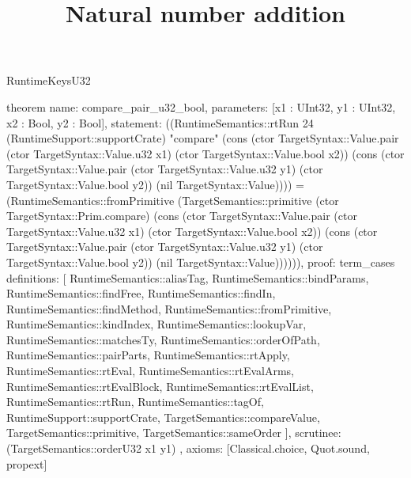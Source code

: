 \begin{lexlean}{RuntimeKeysU32}
\title{Natural number addition}
\begin{semanticmodule}
theorem{
  name: compare_pair_u32_bool,
  parameters: [x1 : UInt32, y1 : UInt32, x2 : Bool, y2 : Bool],
  statement: ((RuntimeSemantics::rtRun 24 (RuntimeSupport::supportCrate) "compare" (cons (ctor TargetSyntax::Value.pair (ctor TargetSyntax::Value.u32 x1) (ctor TargetSyntax::Value.bool x2)) (cons (ctor TargetSyntax::Value.pair (ctor TargetSyntax::Value.u32 y1) (ctor TargetSyntax::Value.bool y2)) (nil TargetSyntax::Value)))) = (RuntimeSemantics::fromPrimitive (TargetSemantics::primitive (ctor TargetSyntax::Prim.compare) (cons (ctor TargetSyntax::Value.pair (ctor TargetSyntax::Value.u32 x1) (ctor TargetSyntax::Value.bool x2)) (cons (ctor TargetSyntax::Value.pair (ctor TargetSyntax::Value.u32 y1) (ctor TargetSyntax::Value.bool y2)) (nil TargetSyntax::Value)))))),
  proof: term_cases{
    definitions: [
      RuntimeSemantics::aliasTag,
      RuntimeSemantics::bindParams,
      RuntimeSemantics::findFree,
      RuntimeSemantics::findIn,
      RuntimeSemantics::findMethod,
      RuntimeSemantics::fromPrimitive,
      RuntimeSemantics::kindIndex,
      RuntimeSemantics::lookupVar,
      RuntimeSemantics::matchesTy,
      RuntimeSemantics::orderOfPath,
      RuntimeSemantics::pairParts,
      RuntimeSemantics::rtApply,
      RuntimeSemantics::rtEval,
      RuntimeSemantics::rtEvalArms,
      RuntimeSemantics::rtEvalBlock,
      RuntimeSemantics::rtEvalList,
      RuntimeSemantics::rtRun,
      RuntimeSemantics::tagOf,
      RuntimeSupport::supportCrate,
      TargetSemantics::compareValue,
      TargetSemantics::primitive,
      TargetSemantics::sameOrder
    ],
    scrutinee: (TargetSemantics::orderU32 x1 y1)
  },
  axioms: [Classical.choice, Quot.sound, propext]
}


\end{semanticmodule}
\end{lexlean}
